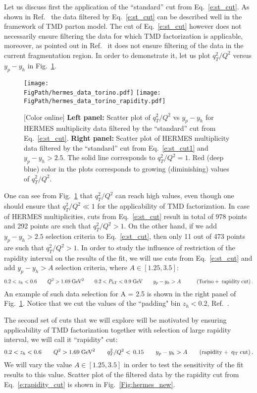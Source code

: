 \documentclass[final,3p,times,onecolumn,sort&compress,hidelinks]{elsarticle}
\newcommand\3[1]{\boldsymbol{#1}}
\newcommand*{\FigPath}{../Figs/}%
\begin{document}
Let us discuss first the application of the ``standard'' cut from Eq.~\eqref{e:st_cut}. As shown in Ref.~\cite{Anselmino:2013lza} the data filtered by Eq.~\eqref{e:st_cut} can be described well in the framework of TMD parton model. The cut of Eq.~\eqref{e:st_cut} however does not necessarily ensure filtering the data for which TMD factorization is applicable, moreover, as pointed out in Ref.~\cite{Boglione:2016bph} it does not ensure filtering of the data in the current fragmentation region. In order to demonstrate it, let us plot $q_T^2/Q^2$ versus $y_p-y_h$ in Fig.~\ref{Fig:hermes_torino}.
\begin{figure}[htb!]
\centering
\texttt{[image: \\FigPath/hermes\_data\_torino.pdf]}
\texttt{[image: \\FigPath/hermes\_data\_torino\_rapidity.pdf]}
\caption{\label{Fig:hermes_torino}
[Color online] {\bf Left panel:} Scatter plot of $q_T^2/Q^2$ vs $y_p-y_h$ for HERMES multiplicity data filtered by the ``standard'' cut from Eq.~\eqref{e:st_cut}. {\bf Right panel:} 
Scatter plot of HERMES multiplicity data filtered by the ``standard'' cut from Eq.~\eqref{e:st_cut1} and $y_p-y_h>2.5$. The solid line corresponds to $q_T^2/Q^2=1$. Red (deep blue) color in the plots corresponds to growing (diminishing) values of $q_T^2/Q^2$.
}
\end{figure}
One can see from Fig.~\ref{Fig:hermes_torino} that $q_T^2/Q^2$ can reach high values, even though one should ensure that $q_T^2/Q^2\ll 1$ for the applicability of TMD factorization. In case of HERMES multiplicities, cuts from Eq.~\eqref{e:st_cut} result in total of 978 points and 292 points are such that $q_T^2/Q^2>1$. On the other hand, if we add $y_p-y_h>2.5$ selection criteria to Eq.~\eqref{e:st_cut}, then only 11 out of 473 points are such that $q_T^2/Q^2>1$. In order to study the influence of restriction of the rapidity interval on the results of the fit, we will use cuts from Eq.~\eqref{e:st_cut} and add $y_p-y_h>A$ selection criteria, where $A \in[1.25, 3.5]$:
\begin{equation}
0.2 < z_h < 0.6 \quad\quad Q^2 > 1.69 \; \textrm{GeV}^2  
\quad\quad 0.2 < P_{hT} < 0.9 \; \textrm{GeV} \quad\quad y_p-y_h > A  \quad\quad\quad{\rm (Torino+\;rapidity\;cut)}\,.\label{e:st_cut1}
\end{equation}
An example of such data selection for A = 2.5 is shown in the right panel of Fig.~\ref{Fig:hermes_torino}. Notice that we cut the values of the ``padding" bin $z_h<0.2$, Ref.~\cite{schnell}.

The second set of cuts that we will explore will be motivated by ensuring applicability of TMD factorization together with selection of large rapidity interval, we will call it ``rapidity" cut:
\begin{equation}
0.2 < z_h < 0.6 \quad\quad Q^2 > 1.69 \; \textrm{GeV}^2  
\quad\quad  q_T^2/Q^2 < \, 0.15   \quad\quad y_p-y_h > A \quad\quad{\rm (rapidity+\;q_T\;cut)}\,.\label{e:rapidity_cut}
\end{equation}
 We will vary the value $A \in[1.25, 3.5]$ in order to test the sensitivity of the fit results to this value. Scatter plot of the filtered data by the rapidity cut from Eq.~\eqref{e:rapidity_cut} is shown in Fig.~\ref{Fig:hermes_new}.
\end{document}
